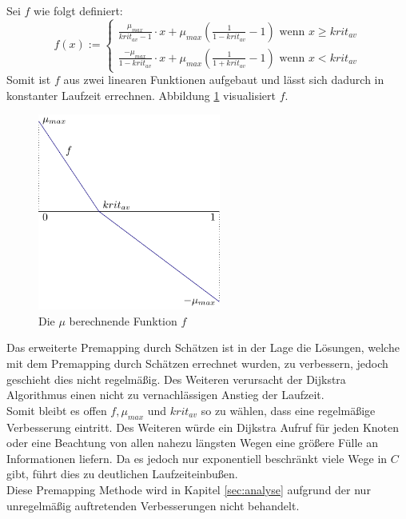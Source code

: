 \documentclass[11pt, a4paper, german]{article}
\begin{document}
Sei $f$ wie folgt definiert:
\[f(x) := \begin{cases} \frac{\mu_{max}}{krit_{av}-1}\cdot x + \mu_{max}(\frac{1}{1-krit_{av}}-1) \text{ wenn } x \geq krit_{av}
 \\ \frac{-\mu_{max}}{1-krit_{av}}\cdot x + \mu_{max}(\frac{1}{1+krit_{av}}-1)  \text{ wenn }x < krit_{av}\end{cases}\]
Somit ist $f$ aus zwei linearen Funktionen aufgebaut und lässt sich dadurch in konstanter Laufzeit errechnen. Abbildung \ref{bild:erw_prem} visualisiert $f$.\\
\begin{figure}
		\includegraphics[width = 6cm]{pictures/compiled/erw_prem}
		\caption{Die $\mu$ berechnende Funktion $f$}
		\label{bild:erw_prem}
\end{figure}
Das erweiterte Premapping durch Schätzen ist in der Lage die Lösungen, welche mit dem Premapping durch Schätzen errechnet wurden, zu verbessern, jedoch geschieht dies nicht regelmäßig. Des Weiteren verursacht der Dijkstra Algorithmus einen nicht zu vernachlässigen Anstieg der Laufzeit. \\
Somit bleibt es offen $f, \mu_{max}$ und $krit_{av}$ so zu wählen, dass eine regelmäßige Verbesserung eintritt. Des Weiteren würde ein Dijkstra Aufruf für jeden Knoten oder eine Beachtung von allen nahezu längsten Wegen eine größere Fülle an Informationen liefern. Da es jedoch nur exponentiell beschränkt viele Wege in $C$ gibt, führt dies zu deutlichen Laufzeiteinbußen. \\

Diese Premapping Methode wird in Kapitel \ref{sec:analyse} aufgrund der nur unregelmäßig auftretenden Verbesserungen nicht behandelt.
\end{document}

